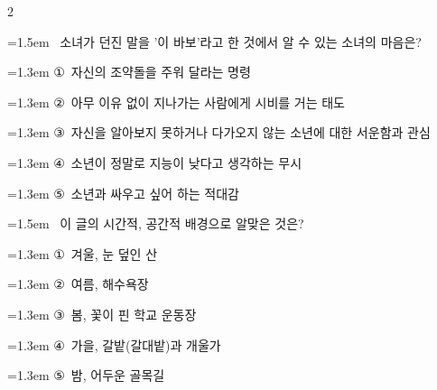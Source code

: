 \documentclass[11pt, a4paper]{article}
\begin{document}
\begin{multicols}{2}
\noindent\begin{minipage}{\columnwidth}
\vspace{2mm}
{\hangindent=1.5em  ~소녀가 던진 말을 '이 바보'라고 한 것에서 알 수 있는 소녀의 마음은?\par}

\vspace{0.5mm}
{\hangindent=1.3em  \noindent\hspace{0.3em}①~자신의 조약돌을 주워 달라는 명령\par}
{\hangindent=1.3em  \noindent\hspace{0.3em}②~아무 이유 없이 지나가는 사람에게 시비를 거는 태도\par}
{\hangindent=1.3em  \noindent\hspace{0.3em}③~자신을 알아보지 못하거나 다가오지 않는 소년에 대한 서운함과 관심\par}
{\hangindent=1.3em  \noindent\hspace{0.3em}④~소년이 정말로 지능이 낮다고 생각하는 무시\par}
{\hangindent=1.3em  \noindent\hspace{0.3em}⑤~소년과 싸우고 싶어 하는 적대감\par}
\vspace{4mm}
\end{minipage}
\par

\noindent\begin{minipage}{\columnwidth}
\vspace{2mm}
{\hangindent=1.5em  ~이 글의 시간적, 공간적 배경으로 알맞은 것은?\par}

\vspace{0.5mm}
{\hangindent=1.3em  \noindent\hspace{0.3em}①~겨울, 눈 덮인 산\par}
{\hangindent=1.3em  \noindent\hspace{0.3em}②~여름, 해수욕장\par}
{\hangindent=1.3em  \noindent\hspace{0.3em}③~봄, 꽃이 핀 학교 운동장\par}
{\hangindent=1.3em  \noindent\hspace{0.3em}④~가을, 갈밭(갈대밭)과 개울가\par}
{\hangindent=1.3em  \noindent\hspace{0.3em}⑤~밤, 어두운 골목길\par}
\vspace{4mm}
\end{minipage}
\par


\end{multicols}
\end{document}
